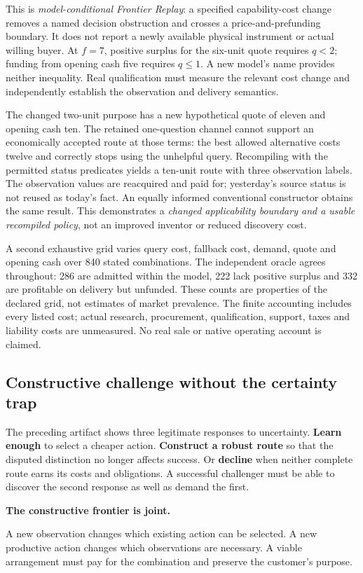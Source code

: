This is \emph{model-conditional Frontier Replay}: a specified capability-cost change removes a named decision obstruction and crosses a price-and-prefunding boundary. It does not report a newly available physical instrument or actual willing buyer. At $f=7$, positive surplus for the six-unit quote requires $q<2$; funding from opening cash five requires $q\leq1$. A new model's name provides neither inequality. Real qualification must measure the relevant cost change and independently establish the observation and delivery semantics.

The changed two-unit purpose has a new hypothetical quote of eleven and opening cash ten. The retained one-question channel cannot support an economically accepted route at those terms: the best allowed alternative costs twelve and correctly stops using the unhelpful query. Recompiling with the permitted status predicates yields a ten-unit route with three observation labels. The observation values are reacquired and paid for; yesterday's source status is not reused as today's fact. An equally informed conventional constructor obtains the same result. This demonstrates a \emph{changed applicability boundary and a usable recompiled policy}, not an improved inventor or reduced discovery cost.

A second exhaustive grid varies query cost, fallback cost, demand, quote and opening cash over 840 stated combinations. The independent oracle agrees throughout: 286 are admitted within the model, 222 lack positive surplus and 332 are profitable on delivery but unfunded. These counts are properties of the declared grid, not estimates of market prevalence. The finite accounting includes every listed cost; actual research, procurement, qualification, support, taxes and liability costs are unmeasured. No real sale or native operating account is claimed.

\subsection{Constructive challenge without the certainty trap}
The preceding artifact shows three legitimate responses to uncertainty. \textbf{Learn enough} to select a cheaper action. \textbf{Construct a robust route} so that the disputed distinction no longer affects success. Or \textbf{decline} when neither complete route earns its costs and obligations. A successful challenger must be able to discover the second response as well as demand the first.

\begin{seabox}
\textbf{The constructive frontier is joint.}\par
A new observation changes which existing action can be selected. A new productive action changes which observations are necessary. A viable arrangement must pay for the combination and preserve the customer's purpose.
\end{seabox}

